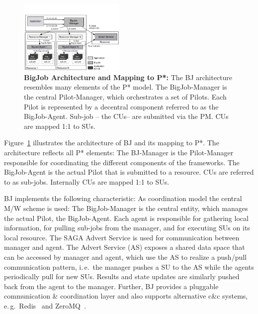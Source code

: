 \documentclass[conference,final]{IEEEtran}
\newcommand{\jhanote}[1]{ {\textcolor{red} { ***shantenu: #1 }}}
\newcommand{\alnote}[1]{ {\textcolor{blue} { ***andreL: #1 }}}
\newcommand{\alnote}[1]{}
\newcommand{\jhanote}[1]{}
\newcommand{\pilot}{Pilot\xspace}
\newcommand{\pilots}{Pilots\xspace}
\newcommand{\cus}{CUs\xspace}
\newcommand{\sus}{SUs\xspace}
\newcommand{\upp}{\vspace*{-0.5em}}
\begin{document}

\begin{figure}[t]
	\upp\upp\upp\upp
	\centering
	\includegraphics[width=0.45\textwidth]{figures/re_bigjob_interactions.pdf}
	\caption{\textbf{BigJob Architecture and Mapping to P*:} The
          BJ architecture resembles many elements of the P* model. The
          BigJob-Manager is the central Pilot-Manager, which
          orchestrates a set of \pilots. Each \pilot is represented by a
          decentral component referred to as the BigJob-Agent. Sub-job
          -- the \cus -- are submitted via the PM. \cus are mapped 1:1
          to \sus. %
        }
	\label{fig:figures_re_bigjob_interactions}
	\upp\upp \upp
\end{figure}


Figure~\ref{fig:figures_re_bigjob_interactions} illustrates the
architecture of BJ and its mapping to P*. The architecture reflects
all P* elements: The BJ-Manager is the Pilot-Manager responsible for
coordinating the different components of the frameworks. The
BigJob-Agent is the actual \pilot that is submitted to a
resource. \cus are referred to as sub-jobs. Internally \cus are mapped
1:1 to \sus.

BJ implements the following characteristic: As coordination model the central
M/W scheme is used: The BigJob-Manager is the central entity, which manages the
actual \pilot, the BigJob-Agent. Each agent is responsible for gathering local
information, for pulling sub-jobs from the manager, and for executing SUs on its
local resource. The SAGA Advert Service is used for communication between
manager and agent. The Advert Service (AS) exposes a shared data space that can
be accessed by manager and agent, which use the AS to realize a push/pull
communication pattern, i.\,e.\ the manager pushes a SU to the AS while the
agents periodically pull for new SUs. Results and state updates are similarly
pushed back from the agent to the manager. Further, BJ provides a pluggable
communication \& coordination layer and also supports alternative c\&c systems,
e.\,g.\ Redis~\cite{redis} and ZeroMQ~\cite{zmq}.
\end{document}
